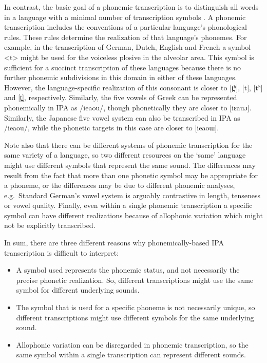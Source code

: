 
In contrast, the basic goal of a phonemic transcription is to distinguish all
words in a language with a minimal number of transcription symbols
\citep[19]{Abercrombie1964}. A phonemic transcription includes the conventions
of a particular language's phonological rules. These rules determine the
realization of that language's phonemes. For example, in the transcription of
German, Dutch, English and French a symbol <t> might be used for the voiceless
plosive in the alveolar area. This symbol is sufficient for a succinct
transcription of these languages because there is no further phonemic
subdivisions in this domain in either of these languages. However, the
language-specific realization of this consonant is closer to [t̪ʰ], [t], [tʰ]
and [t̪], respectively. Similarly, the five vowels of Greek can be represented
phonemically in IPA as /ieaou/, though phonetically they are closer to [iεauɔ].
Similarly, the Japanese five vowel system can also be transcribed in IPA as
/ieaou/, while the phonetic targets in this case are closer to [ieaoɯ].

Note also that there can be different systems of phonemic transcription for the
same variety of a language, so two different resources on the `same' language
might use different symbols that represent the same sound. The differences may
result from the fact that more than one phonetic symbol may be appropriate for a
phoneme, or the differences may be due to different phonemic analyses, e.g.\
Standard German's vowel system is arguably contrastive in length, tenseness or
vowel quality. Finally, even within a single phonemic transcription a specific
symbol can have different realizations because of allophonic variation which 
might not be explicitly transcribed.

In sum, there are three different reasons why phonemically-based IPA 
transcription is difficult to interpret:

\begin{itemize}
  
   \item A symbol used represents the phonemic status, and not necessarily the
         precise phonetic realization. So, different transcriptions might use 
         the same symbol for different underlying sounds.
   \item The symbol that is used for a specific phoneme is not necessarily
         unique, so different transcriptions might use different symbols for the
         same underlying sound.
   \item Allophonic variation can be disregarded in phonemic transcription, so
         the same symbol within a single transcription can represent different
         sounds.
  
\end{itemize}

